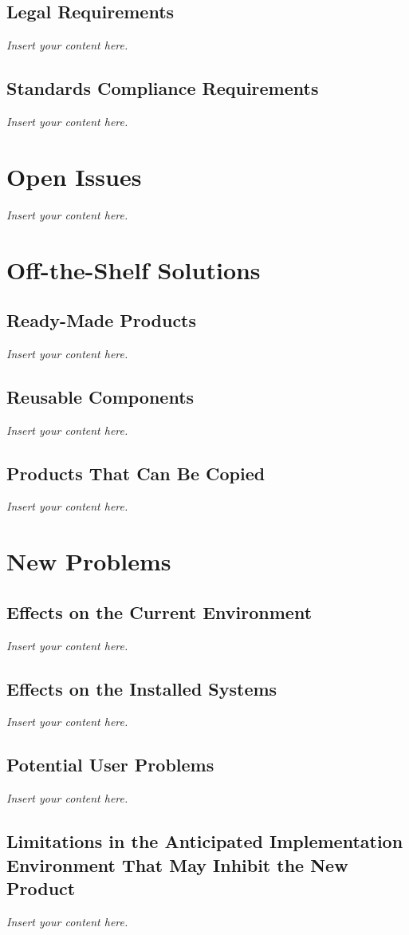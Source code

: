 \documentclass[12pt]{article}
\newcommand{\lips}{\textit{Insert your content here.}}
\begin{document}
\subsection{Legal Requirements}
\lips
\subsection{Standards Compliance Requirements}
\lips

\section{Open Issues}
\lips

\section{Off-the-Shelf Solutions}
\subsection{Ready-Made Products}
\lips
\subsection{Reusable Components}
\lips
\subsection{Products That Can Be Copied}
\lips

\section{New Problems}
\subsection{Effects on the Current Environment}
\lips
\subsection{Effects on the Installed Systems}
\lips
\subsection{Potential User Problems}
\lips
\subsection{Limitations in the Anticipated Implementation Environment That May
Inhibit the New Product}
\lips
\end{document}
